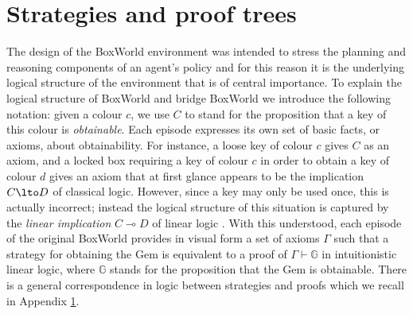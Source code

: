 \documentclass{article} %
\begin{document}


\section{Strategies and proof trees}
\label{appendix:strategies}

The design of the BoxWorld environment was intended to stress the planning and reasoning components of an agent's policy \cite[p.2]{zambaldi} and for this reason it is the underlying logical structure of the environment that is of central importance. To explain the logical structure of BoxWorld and bridge BoxWorld we introduce the following notation: given a colour $c$, we use $C$ to stand for the proposition that a key of this colour is \emph{obtainable}.  Each episode expresses its own set of basic facts, or axioms, about obtainability. For instance, a loose key of colour $c$ gives $C$ as an axiom, and a locked box requiring a key of colour $c$ in order to obtain a key of colour $d$ gives an axiom that at first glance appears to be the implication $C \lto D$ of classical logic. However, since a key may only be used once, this is actually incorrect; instead the logical structure of this situation is captured by the \emph{linear implication} $C \multimap D$ of linear logic \citep{girard_llogic}. With this understood, each episode of the original BoxWorld provides in visual form a set of axioms $\Gamma$ such that a strategy for obtaining the Gem is equivalent to a proof of $\Gamma \vdash \mathbb{G}$ in intuitionistic linear logic, where $\mathbb{G}$ stands for the proposition that the Gem is obtainable. There is a general correspondence in logic between strategies and proofs which we recall in Appendix \ref{appendix:strategies}.
\end{document}

